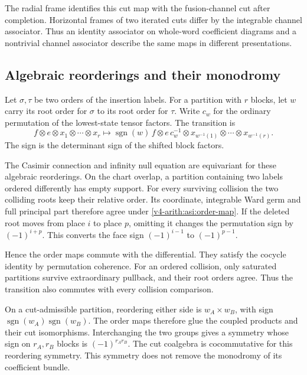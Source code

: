 The radial frame identifies this cut map with the fusion-channel
cut after completion. Horizontal frames of two iterated cuts differ
by the integrable channel associator. Thus an identity associator
on whole-word coefficient diagrams and a nontrivial channel
associator describe the same maps in different presentations.

\subsection{Algebraic reorderings and their monodromy}
\label{v4-arith:asi:reordering}

Let \(\sigma,\tau\) be two orders of the insertion labels.
For a partition with \(r\) blocks, let \(w\) carry its root order
for \(\sigma\) to its root order for \(\tau\).
Write \(c_w\) for the ordinary permutation of the lowest-state
tensor factors. The transition is
\begin{equation}\label{v4-arith:asi:order-map}
 f\otimes e\otimes x_1\otimes\cdots\otimes x_r
 \longmapsto
 \operatorname{sgn}(w)\,
 f\otimes e\,c_w^{-1}\otimes
 x_{w^{-1}(1)}\otimes\cdots\otimes x_{w^{-1}(r)}.
\end{equation}
The sign is the determinant sign of the shifted block factors.

The Casimir connection and infinity null equation are equivariant
for these algebraic reorderings.
On the chart overlap, a partition containing two labels ordered
differently has empty support. For every surviving collision the
two colliding roots keep their relative order.
Its coordinate, integrable Ward germ and full principal part
therefore agree under \eqref{v4-arith:asi:order-map}.
If the deleted root moves from place \(i\) to place \(p\),
omitting it changes the permutation sign by \((-1)^{i+p}\).
This converts the face sign \((-1)^{i-1}\) to \((-1)^{p-1}\).

Hence the order maps commute with the differential.
They satisfy the cocycle identity by permutation coherence.
For an ordered collision, only saturated partitions survive
extraordinary pullback, and their root orders agree.
Thus the transition also commutes with every collision comparison.

On a cut-admissible partition, reordering either side is
\(w_A\times w_B\), with sign
\(\operatorname{sgn}(w_A)\operatorname{sgn}(w_B)\).
The order maps therefore glue the coupled products and their
cut isomorphisms. Interchanging the two groups gives a symmetry
whose sign on \(r_A,r_B\) blocks is \((-1)^{r_Ar_B}\).
The cut coalgebra is cocommutative for this reordering symmetry.
This symmetry does not remove the monodromy of its coefficient
bundle.

